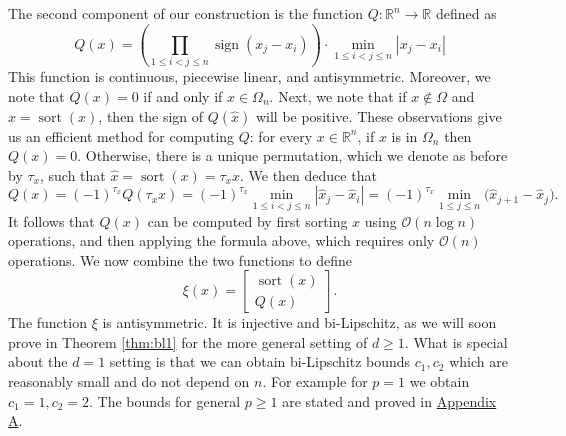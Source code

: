 \documentclass{amsart}
\theoremstyle{plain}
\theoremstyle{definition}
\theoremstyle{remark}
\DeclareMathOperator{\sort}{sort}
\DeclareMathOperator{\sign}{sign}
\newcommand{\RR}{\mathbb{R}}
\newcommand{\abs}[1]{\left\lvert#1\right\rvert}
\begin{document}
The second component of our construction is the function $Q:\RR^n \to \RR$ defined as
\begin{equation} \label{def:Q}
    Q(x)=\left(\prod_{1\leq i<j \leq n} \sign(x_j-x_i) \right) \cdot \min_{1\leq i<j\leq n}{\abs{x_j-x_i}}
\end{equation}
This function is continuous, piecewise linear, and antisymmetric. Moreover, we note that $Q(x)=0$ if and only if $x \in \Omega_n$. Next, we note that if $x\not \in \Omega $  and $\hat x=\sort(x)$, then the sign of $Q(\hat x)$ will be positive. These observations give us an efficient method for computing $Q$: for every $x\in \RR^n$, if $x$ is in $\Omega_n$ then $Q(x)=0$. Otherwise, there is a unique permutation, which we denote as before by $\tau_x$, such that 
$\hat x=\sort(x)=\tau_x x $. We then deduce that
\begin{equation}
    Q(x)=(-1)^{\tau_x}Q(\tau_x x)=(-1)^{\tau_x}\min_{1\leq i<j\leq n} |\hat x_j-\hat x_i|=(-1)^{\tau_x}\min_{1\leq j\leq n} \bigl( \hat x_{j+1}-\hat x_j\bigr). 
\end{equation}
It follows that $Q(x)$ can be computed by first sorting $x$ using $\mathcal{O}(n\log n)$ operations, and then applying the formula above, which requires only $\mathcal{O}(n)$ operations. We now combine the two functions to define 
\begin{equation}
    \xi(x) = \begin{bmatrix}
\sort{(x)} \\ Q(x)
\end{bmatrix}.
\end{equation}
The function $\xi$ is antisymmetric. It is injective and bi-Lipschitz, as we will soon prove in Theorem \ref{thm:bl1} for the more general setting of $d \geq 1$. What is special about the $d=1$ setting is that we can obtain bi-Lipschitz bounds $c_1,c_2$ which are reasonably small and do not depend on $n$. For example for $p=1$ we obtain $c_1=1,c_2=2$. The bounds for general $p\geq 1$ are stated and proved in \href{sec:appendixA}{Appendix A}.
\end{document}
